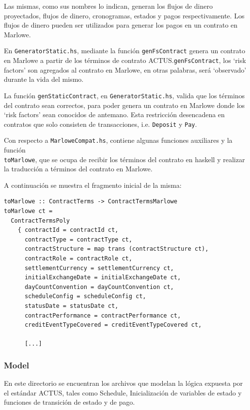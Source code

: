 \documentclass[12pt]{book}
\begin{document}
Las mismas, como sus nombres lo indican, generan los flujos de dinero proyectados, flujos de dinero, cronogramas, estados y pagos respectivamente. Los flujos de dinero pueden ser utilizados para generar los pagos en un contrato en Marlowe.

En \texttt{GeneratorStatic.hs}, mediante la función \texttt{genFsContract} genera un contrato en Marlowe a partir de los términos de contrato ACTUS.\@En \texttt{genFsContract}, los `risk factors' son agregados al contrato en Marlowe, en otras palabras, será `observado' durante la vida del mismo.

La función \texttt{genStaticContract}, en \texttt{GeneratorStatic.hs}, valida que los términos del contrato sean correctos, para poder genera un contrato en Marlowe donde los `risk factors' sean conocidos de antemano. Esta restricción desencadena en contratos que solo consisten de transacciones, i.e. \texttt{Deposit} y \texttt{Pay}.

Con respecto a \texttt{MarloweCompat.hs}, contiene algunas funciones auxiliares y la función\\ \texttt{toMarlowe}, que se ocupa de recibir los términos del contrato en haskell y realizar la traducción a términos del contrato en Marlowe. 

A continuación se muestra el fragmento inicial de la misma:


\begin{lstlisting}[style=Haskell-cardano, caption=Comienzo de la función \texttt{toMarlowe}]
toMarlowe :: ContractTerms -> ContractTermsMarlowe
toMarlowe ct =
  ContractTermsPoly
    { contractId = contractId ct,
      contractType = contractType ct,
      contractStructure = map trans (contractStructure ct),
      contractRole = contractRole ct,
      settlementCurrency = settlementCurrency ct,
      initialExchangeDate = initialExchangeDate ct,
      dayCountConvention = dayCountConvention ct,
      scheduleConfig = scheduleConfig ct,
      statusDate = statusDate ct,
      contractPerformance = contractPerformance ct,
      creditEventTypeCovered = creditEventTypeCovered ct,

      [...]
\end{lstlisting}

\subsubsection{Model}

En este directorio se encuentran los archivos que modelan la lógica expuesta por el estándar ACTUS, tales como Schedule, Inicialización de variables de estado y funciones de transición de estado y de pago.
\end{document}
